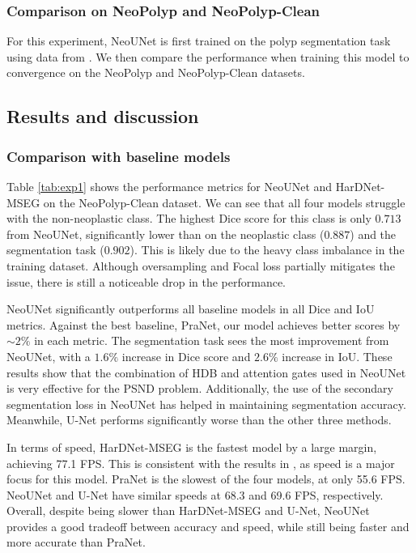 \documentclass[runningheads]{llncs}
\newcommand{\ModelName}{NeoUNet\xspace}
\newcommand{\DatasetName}{NeoPolyp\xspace}
\newcommand{\CleanDatasetName}{NeoPolyp-Clean\xspace}
\begin{document}
	\subsubsection{Comparison on \DatasetName and \CleanDatasetName}
	For this experiment, \ModelName is first trained on the polyp segmentation task using data from \cite{jha2019resunet++}. We then compare the performance when training this model to convergence on the \DatasetName and \CleanDatasetName datasets.

	\subsection{Results and discussion}

	\subsubsection{Comparison with baseline models}
	Table \ref{tab:exp1} shows the performance metrics for \ModelName and HarDNet-MSEG on the \CleanDatasetName dataset. We can see that all four models struggle with the non-neoplastic class. The highest Dice score for this class is only $0.713$ from \ModelName, significantly lower than on the neoplastic class ($0.887$) and the segmentation task ($0.902$). This is likely due to the heavy class imbalance in the training dataset. Although oversampling and Focal loss partially mitigates the issue, there is still a noticeable drop in the performance.

	\ModelName significantly outperforms all baseline models in all Dice and IoU metrics. Against the best baseline, PraNet, our model achieves better scores by $\sim 2\%$ in each metric. The segmentation task sees the most improvement from \ModelName, with a $1.6\%$ increase in Dice score and $2.6\%$ increase in IoU. These results show that the combination of HDB and attention gates used in \ModelName is very effective for the PSND problem. Additionally, the use of the secondary segmentation loss in \ModelName has helped in maintaining segmentation accuracy. Meanwhile, U-Net performs significantly worse than the other three methods.

	In terms of speed, HarDNet-MSEG is the fastest model by a large margin, achieving 77.1 FPS. This is consistent with the results in \cite{huang2021hardnet}, as speed is a major focus for this model. PraNet is the slowest of the four models, at only 55.6 FPS. \ModelName and U-Net have similar speeds at 68.3 and 69.6 FPS, respectively. Overall, despite being slower than HarDNet-MSEG and U-Net, \ModelName provides a good tradeoff between accuracy and speed, while still being faster and more accurate than PraNet.
\end{document}

